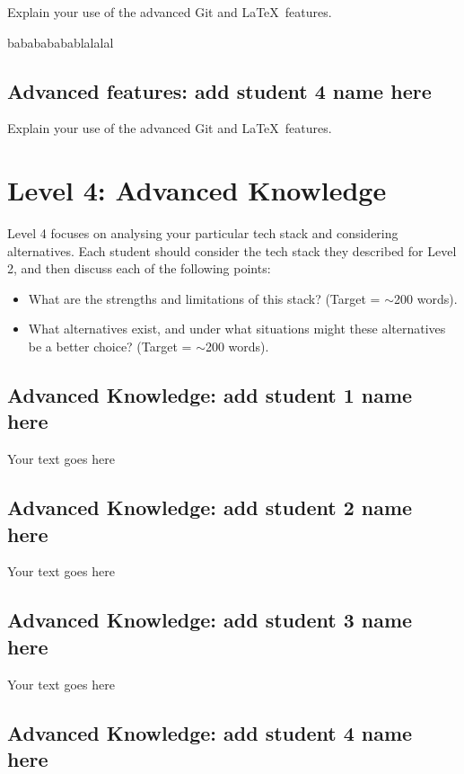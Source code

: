 \documentclass[a4paper, 11pt]{report}
\begin{document}
Explain your use of the advanced Git and \LaTeX\ features. 

bababababablalalal

\subsection{Advanced features: add student 4 name here}

Explain your use of the advanced Git and \LaTeX\ features. 




\newpage
\section{Level 4: Advanced Knowledge}

Level 4 focuses on analysing your particular tech stack and considering alternatives. Each student should consider the tech stack they described for Level 2, and then discuss each of the following points:
\begin{itemize}
    \item What are the strengths and limitations of this stack? (Target = $\sim$200 words).
    \item What alternatives exist, and under what situations might these alternatives be a better choice? (Target = $\sim$200 words).
\end{itemize}

\subsection{Advanced Knowledge: add student 1 name here}

Your text goes here

\subsection{Advanced Knowledge: add student 2 name here}

Your text goes here

\subsection{Advanced Knowledge: add student 3 name here}

Your text goes here

\subsection{Advanced Knowledge: add student 4 name here}
\end{document}
